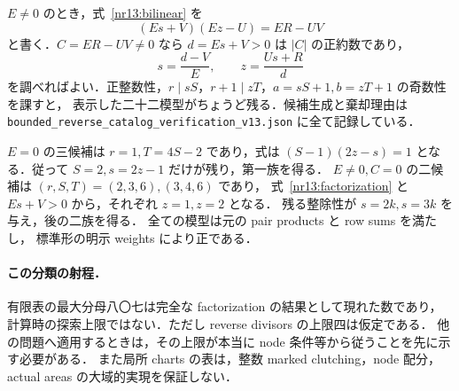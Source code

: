 $E\ne0$ のとき，式~\eqref{nr13:bilinear} を
\begin{equation}\label{nr13:factorization}
 (Es+V)(Ez-U)=ER-UV
\end{equation}
と書く．$C=ER-UV\ne0$ なら $d=Es+V>0$ は $|C|$ の正約数であり，
\[
 s=\frac{d-V}{E},\qquad z=\frac{Us+R}{d}
\]
を調べればよい．正整数性，$r\mid sS$，$r+1\mid zT$，$a=sS+1,b=zT+1$ の奇数性を課すと，
表示した二十二模型がちょうど残る．候補生成と棄却理由は
\texttt{bounded\_reverse\_catalog\_verification\_v13.json} に全て記録している．

$E=0$ の三候補は $r=1,T=4S-2$ であり，式は
$(S-1)(2z-s)=1$ となる．従って $S=2,s=2z-1$ だけが残り，第一族を得る．
$E\ne0,C=0$ の二候補は $(r,S,T)=(2,3,6),(3,4,6)$ であり，
式~\eqref{nr13:factorization} と $Es+V>0$ から，それぞれ $z=1,z=2$ となる．
残る整除性が $s=2k,s=3k$ を与え，後の二族を得る．
全ての模型は元の pair products と row sums を満たし，
標準形の明示 weights により正である．

\paragraph{この分類の射程．}
有限表の最大分母八〇七は完全な factorization の結果として現れた数であり，
計算時の探索上限ではない．ただし reverse divisors の上限四は仮定である．
他の問題へ適用するときは，その上限が本当に node 条件等から従うことを先に示す必要がある．
また局所 charts の表は，整数 marked clutching，node 配分，actual areas の大域的実現を保証しない．
